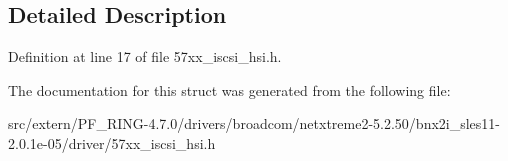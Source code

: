 \subsection{Detailed Description}


Definition at line 17 of file 57xx\_\-iscsi\_\-hsi.h.



The documentation for this struct was generated from the following file:\begin{DoxyCompactItemize}
\item 
src/extern/PF\_\-RING-\/4.7.0/drivers/broadcom/netxtreme2-\/5.2.50/bnx2i\_\-sles11-\/2.0.1e-\/05/driver/57xx\_\-iscsi\_\-hsi.h\end{DoxyCompactItemize}
